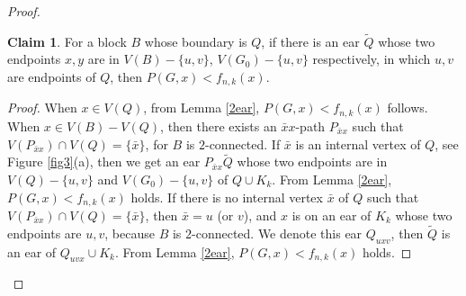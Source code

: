 \documentclass[12pt]{article}
\theoremstyle{definition}
\newtheorem{claim}{Claim}
\begin{document}
\begin{proof}
\begin{claim}\label{c4} For a block $B$ whose boundary is $Q$,  if there is an ear $\tilde{Q}$ whose two endpoints $x,y$ are in $V(B)-\{u,v\}$, $V(G_0)-\{u,v\}$ respectively, in which $u,v$ are endpoints of $Q$, then  $P(G,x)<f_{n,k}(x)$.
\end{claim}

\begin{proof} When $x\in V(Q)$, from Lemma \ref{2ear}, $P(G,x)<f_{n,k}(x)$ follows. When $x\in V(B)-V(Q)$, then there exists an $\bar{x}x$-path $P_{\bar{x}x}$ such that $V(P_{\bar{x}x})\cap V(Q)=\{\bar{x}\}$, for $B$ is $2$-connected. If $\bar{x}$ is an internal vertex of $Q$, see Figure \ref{fig3}(a), then we get an ear $P_{\bar{x}x}\tilde{Q}$ whose two endpoints are in $V(Q)-\{u,v\}$ and $V(G_0)-\{u,v\}$ of $Q\cup K_k$. From Lemma \ref{2ear}, $P(G,x)<f_{n,k}(x)$ holds.
If there is no internal vertex $\bar{x}$ of $Q$ such that $V(P_{\bar{x}x})\cap V(Q)=\{\bar{x}\}$, then $\bar{x}=u$ (or $v$), and $x$ is on an ear of $K_k$ whose two endpoints are $u,v$, because $B$ is $2$-connected. We denote this ear $Q_{uxv}$, then $\tilde{Q}$ is an ear of $Q_{uvx}\cup K_k$. From Lemma \ref{2ear}, $P(G,x)<f_{n,k}(x)$ holds.
\end{proof}


\begin{figure}[h]
\begin{center}
\end{center}
\end{figure}
\end{proof}
\end{document}
